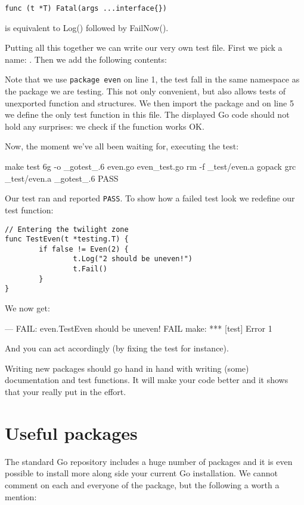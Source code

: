 \begin{lstlisting}[numbers=none]
func (t *T) Fatal(args ...interface{})
\end{lstlisting}
 is equivalent to Log() followed by FailNow().

Putting all this together we can write our very own test file. First
we pick a name: . Then we add the following contents:

Note that we use \lstinline{package even} on line 1, the test fall in the same
namespace as the package we are testing. This not only convenient, but
also allows tests of unexported function and structures. We then import
the  package and on line 5 we define the only test
function in this file. The displayed Go code should not hold any
surprises: we check if the  function works OK. 

Now, the moment we've all been waiting for, executing the test:
\begin{display}
\pr make test
6g -o \_gotest\_.6 even.go  even\_test.go
rm -f \_test/even.a
gopack grc \_test/even.a \_gotest\_.6 
PASS
\end{display}
\noindent{}Our test ran and reported \texttt{PASS}. To show how a failed
test look we redefine our test function:
\begin{lstlisting}
// Entering the twilight zone
func TestEven(t *testing.T) {
        if false != Even(2) {
                t.Log("2 should be uneven!")
                t.Fail()
        }   
}
\end{lstlisting}
We now get:
\begin{display}
--- FAIL: even.TestEven
\qquad{} should be uneven!
FAIL
make: *** [test] Error 1
\end{display}
\noindent{}And you can act accordingly (by fixing the test for instance).

\begin{lbar}
Writing new packages should go hand in hand with writing (some)
documentation and test functions. It will make your code better and it
shows that your really put in the effort.
\end{lbar}

\section{Useful packages}
The standard Go repository includes a huge number of packages and it is
even possible to install more along side your current Go installation. 
We cannot comment on each and everyone of the package, but the following
a worth a mention:

